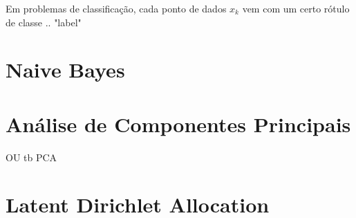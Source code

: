 Em problemas de classificação, cada ponto de dados $x_k$ vem com um certo rótulo de classe .. "label"


\section{Naive Bayes}




\section{Análise de Componentes Principais}

OU tb PCA

\section{Latent Dirichlet Allocation}



